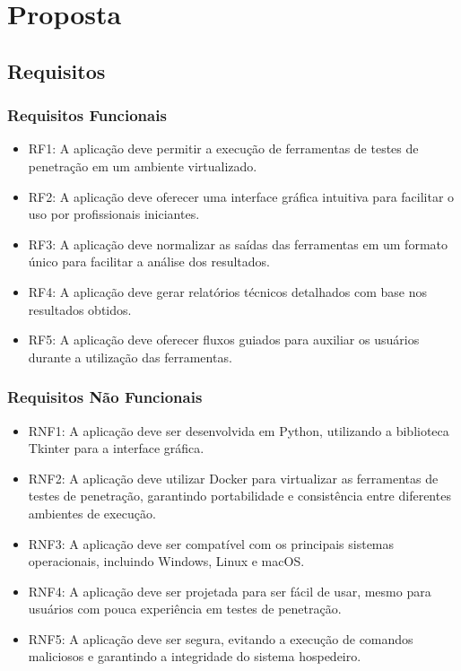 \chapter{Proposta}
\label{sec:proposta}

\section{Requisitos}
    \subsection{Requisitos Funcionais}
        \begin{itemize}
            \item RF1: A aplicação deve permitir a execução de ferramentas de testes de penetração em um ambiente virtualizado.
            \item RF2: A aplicação deve oferecer uma interface gráfica intuitiva para facilitar o uso por profissionais iniciantes.
            \item RF3: A aplicação deve normalizar as saídas das ferramentas em um formato único para facilitar a análise dos resultados.
            \item RF4: A aplicação deve gerar relatórios técnicos detalhados com base nos resultados obtidos.
            \item RF5: A aplicação deve oferecer fluxos guiados para auxiliar os usuários durante a utilização das ferramentas.
        \end{itemize}

    \subsection{Requisitos Não Funcionais}
        \begin{itemize}
            \item RNF1: A aplicação deve ser desenvolvida em Python, utilizando a biblioteca Tkinter para a interface gráfica.
            \item RNF2: A aplicação deve utilizar Docker para virtualizar as ferramentas de testes de penetração, garantindo portabilidade e consistência entre diferentes ambientes de execução.
            \item RNF3: A aplicação deve ser compatível com os principais sistemas operacionais, incluindo Windows, Linux e macOS.
            \item RNF4: A aplicação deve ser projetada para ser fácil de usar, mesmo para usuários com pouca experiência em testes de penetração.
            \item RNF5: A aplicação deve ser segura, evitando a execução de comandos maliciosos e garantindo a integridade do sistema hospedeiro.
        \end{itemize}

